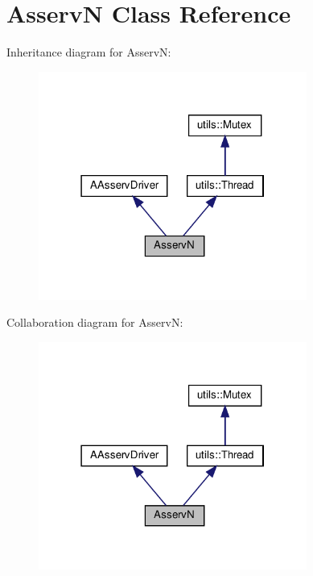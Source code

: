 \hypertarget{classAsservN}{}\section{AsservN Class Reference}
\label{classAsservN}


Inheritance diagram for AsservN\+:
\nopagebreak
\begin{figure}[H]
\begin{center}
\leavevmode
\includegraphics[width=250pt]{classAsservN__inherit__graph}
\end{center}
\end{figure}


Collaboration diagram for AsservN\+:
\nopagebreak
\begin{figure}[H]
\begin{center}
\leavevmode
\includegraphics[width=250pt]{classAsservN__coll__graph}
\end{center}
\end{figure}
